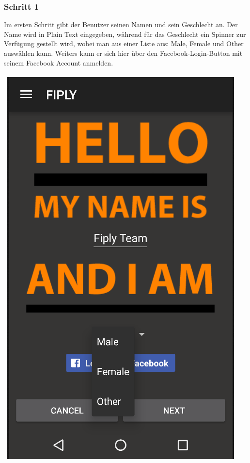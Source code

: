 \documentclass[FIPLY_base.tex]{subfiles}
\begin{document}
\subsubsection{Schritt 1}
Im ersten Schritt gibt der Benutzer seinen Namen und sein Geschlecht an.
Der Name wird in Plain Text eingegeben, während für das Geschlecht ein Spinner zur Verfügung gestellt wird, wobei man aus einer Liste aus: Male, Female und Other auswählen kann.
Weiters kann er sich hier über den Facebook-Login-Button mit seinem Facebook Account anmelden.
\\\
\\\
\includegraphics[scale=0.4]{img/User_step1}
\newpage
\end{document}
